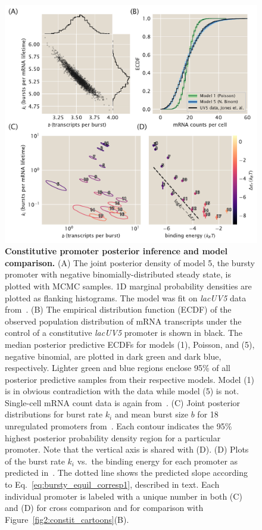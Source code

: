 \begin{figure}%
\centering
\includegraphics[width=\textwidth]{../figures/main/fig03.pdf}
\caption{\textbf{Constitutive promoter posterior inference and model
comparison.} (A) The joint posterior density of model 5, the bursty promoter
with negative binomially-distributed steady state, is plotted with MCMC samples.
1D marginal probability densities are plotted as flanking histograms. The model
was fit on \textit{lacUV5} data from~\cite{Jones2014}. (B) The empirical
distribution function (ECDF) of the observed population distribution of mRNA
transcripts under the control of a constitutive \textit{lacUV5} promoter is
shown in black. The median posterior predictive ECDFs for models (1), Poisson,
and (5), negative binomial, are plotted in dark green and dark blue,
respectively. Lighter green and blue regions enclose 95\% of all posterior
predictive samples from their respective models. Model (1) is in obvious
contradiction with the data while model (5) is not. Single-cell mRNA count data
is again from~\cite{Jones2014}. (C) Joint posterior distributions for burst rate
$k_i$ and mean burst size $b$ for 18 unregulated promoters
from~\cite{Jones2014}. Each contour indicates the 95\% highest posterior
probability density region for a particular promoter. Note that the vertical
axis is shared with (D). (D) Plots of the burst rate $k_i$ vs.\ the binding
energy for each promoter as predicted in~\cite{Brewster2012}. The dotted line
shows the predicted slope according to Eq.~\ref{eq:bursty_equil_corresp1},
described in text. Each individual promoter is labeled with a unique number in
both (C) and (D) for cross comparison and for comparison with 
Figure~\ref{fig2:constit_cartoons}(B).}
\label{fig:constit_post_full}
\end{figure}

